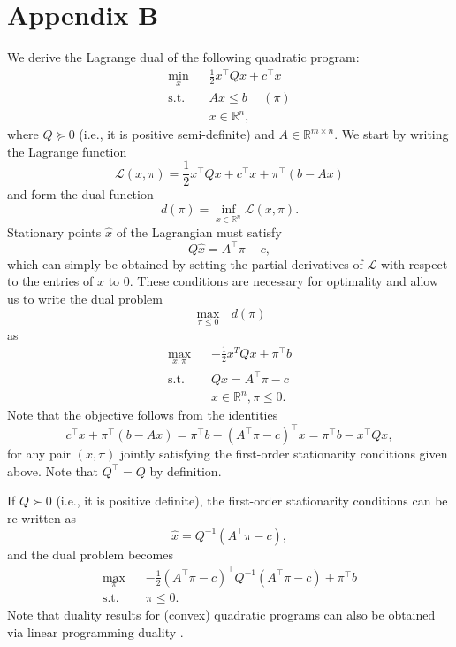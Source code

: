 \documentclass{article}
\begin{document}
\section*{Appendix B}
We derive the Lagrange dual of the following quadratic program:
\begin{align*}
\underset{x}{\min} \hspace{10pt} & \frac{1}{2}x^\top Q x + c^\top x\\
\mbox{s.t. } & Ax \le b \hspace{15pt} (\pi)\\
&x \in \mathbb{R}^n,
\end{align*}
where $Q \succeq 0$ (i.e., it is positive semi-definite) and $A \in \mathbb{R}^{m \times n}$. We start by writing the Lagrange function
\begin{equation*}
\mathcal{L}(x, \pi) = \frac{1}{2}x^\top Q x + c^\top x + \pi^\top(b - Ax)
\end{equation*}
and form the dual function
\begin{equation*}
d(\pi) = \underset{x \in \mathbb{R}^n}{\inf} \mathcal{L}(x, \pi).
\end{equation*}
Stationary points $\hat{x}$ of the Lagrangian must satisfy
\begin{equation*}
Q\hat{x} = A^\top \pi -c,
\end{equation*}
which can simply be obtained by setting the partial derivatives of $\mathcal{L}$ with respect to the entries of $x$ to $0$. These conditions are necessary for optimality and allow us to write the dual problem
\begin{equation*}
\underset{\pi \le 0}{\max} \mbox{ }d(\pi)
\end{equation*}
as
\begin{align*}
\underset{x, \pi}{\max} \hspace{10pt} & -\frac{1}{2}x^T Q x + \pi^\top b\\
\mbox{s.t. } & Qx = A^\top \pi -c\\
&x \in \mathbb{R}^n, \pi \le 0.
\end{align*}
Note that the objective follows from the identities
\begin{equation*}
c^\top x + \pi^\top(b - Ax) = \pi^\top b - (A^\top \pi - c)^\top x =  \pi^\top b - x^\top Q x,
\end{equation*}
for any pair $(x, \pi)$ jointly satisfying the first-order stationarity conditions given above. Note that $Q^\top = Q$ by definition. 

If $Q \succ 0$ (i.e., it is positive definite), the first-order stationarity conditions can be re-written as
\begin{equation*}
\hat{x} = Q^{-1}(A^\top \pi - c),
\end{equation*}
and the dual problem becomes
\begin{align*}
\underset{\pi}{\max} \hspace{10pt} & -\frac{1}{2}(A^\top \pi -c)^\top Q^{-1} (A^\top \pi -c) + \pi^\top b\\
\mbox{s.t. } & \pi \le 0.
\end{align*}
Note that duality results for (convex) quadratic programs can also be obtained via linear programming duality \cite{Dorn1960}.


\end{document}
